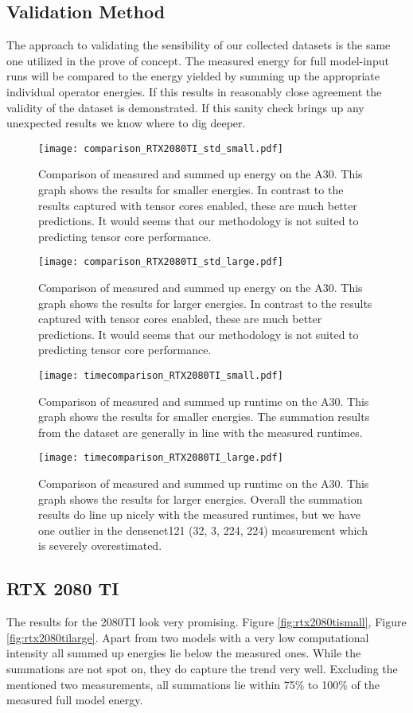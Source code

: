 \documentclass[conference]{IEEEtran}
\begin{document}
\subsection{Validation Method}
The approach to validating the sensibility of our collected datasets is the same one utilized in the prove of concept. The measured energy for full model-input runs will be compared to the energy yielded by summing up the appropriate individual operator energies. If this results in reasonably close agreement the validity of the dataset is demonstrated. If this sanity check brings up any unexpected results we know where to dig deeper.


\begin{figure}
    \texttt{[image: comparison\_RTX2080TI\_std\_small.pdf]}
    \caption{Comparison of measured and summed up energy on the A30. This graph shows the results for smaller energies. In contrast to the results captured with tensor cores enabled, these are much better predictions. It would seems that our methodology is not suited to predicting tensor core performance.}
    \label{fig:a30notcsmall}
    \texttt{[image: comparison\_RTX2080TI\_std\_large.pdf]}
    \caption{Comparison of measured and summed up energy on the A30. This graph shows the results for larger energies. In contrast to the results captured with tensor cores enabled, these are much better predictions. It would seems that our methodology is not suited to predicting tensor core performance.}
    \label{fig:a30notclarge}
\end{figure}


\begin{figure}
    \texttt{[image: timecomparison\_RTX2080TI\_small.pdf]}
    \caption{Comparison of measured and summed up runtime on the A30. This graph shows the results for smaller energies. The summation results from the dataset are generally in line with the measured runtimes.}
    \label{fig:a30_notcsmalltime}
    \texttt{[image: timecomparison\_RTX2080TI\_large.pdf]}
    \caption{Comparison of measured and summed up runtime on the A30. This graph shows the results for larger energies. Overall the summation results do line up nicely with the measured runtimes, but we have one outlier in the densenet121 (32, 3, 224, 224) measurement which is severely overestimated.}
    \label{fig:a30notclargetime}
\end{figure}

\subsection{RTX 2080 TI}
The results for the 2080TI look very promising. Figure \ref{fig:rtx2080tismall}, Figure \ref{fig:rtx2080tilarge}. Apart from two models with a very low computational intensity all summed up energies lie below the measured ones. While the summations are not spot on, they do capture the trend very well. Excluding the mentioned two measurements, all summations lie within 75\% to 100\% of the measured full model energy.
\end{document}

